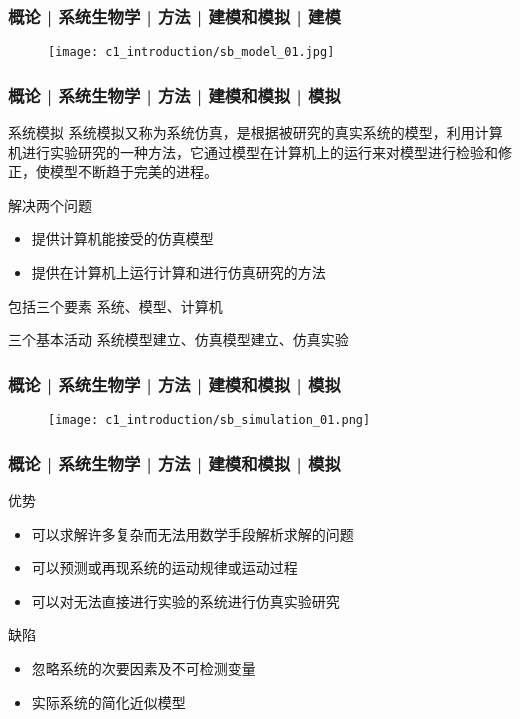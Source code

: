 \begin{frame}
  \frametitle{概论 | 系统生物学 | 方法 | 建模和模拟 | 建模}
  \begin{figure}
    \centering
    \texttt{[image: c1\_introduction/sb\_model\_01.jpg]}
  \end{figure}
\end{frame}

\begin{frame}
  \frametitle{概论 | 系统生物学 | 方法 | 建模和模拟 | 模拟}
  \begin{block}{系统模拟}
系统模拟又称为系统仿真，是根据被研究的真实系统的模型，利用计算机进行实验研究的一种方法，它通过模型在计算机上的运行来对模型进行检验和修正，使模型不断趋于完美的进程。  
  \end{block}
  \pause
  \begin{block}{解决两个问题}
    \begin{itemize}
      \item 提供计算机能接受的仿真模型
      \item 提供在计算机上运行计算和进行仿真研究的方法
    \end{itemize}
  \end{block}
  \pause
  \begin{block}{包括三个要素}
      系统、模型、计算机
  \end{block}
  \pause
  \begin{block}{三个基本活动}
     系统模型建立、仿真模型建立、仿真实验
  \end{block}
\end{frame}

\begin{frame}
  \frametitle{概论 | 系统生物学 | 方法 | 建模和模拟 | 模拟}
  \begin{figure}
    \centering
    \texttt{[image: c1\_introduction/sb\_simulation\_01.png]}
  \end{figure}
\end{frame}

\begin{frame}
  \frametitle{概论 | 系统生物学 | 方法 | 建模和模拟 | 模拟}
  \begin{block}{优势}
    \begin{itemize}
      \item 可以求解许多复杂而无法用数学手段解析求解的问题
      \item 可以预测或再现系统的运动规律或运动过程
      \item 可以对无法直接进行实验的系统进行仿真实验研究
    \end{itemize}
  \end{block}
  \pause
  \begin{block}{缺陷}
    \begin{itemize}
      \item 忽略系统的次要因素及不可检测变量
      \item 实际系统的简化近似模型
    \end{itemize}
  \end{block}
\end{frame}

